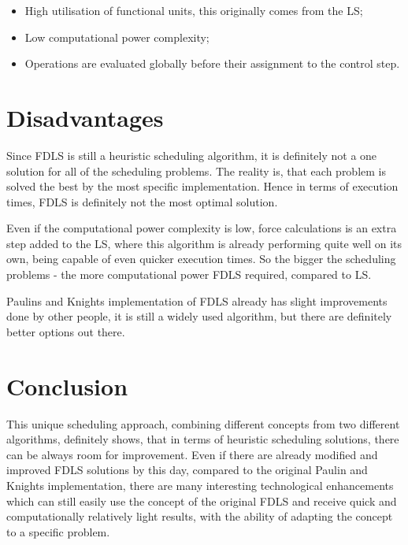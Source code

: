 \documentclass[conference]{IEEEtran}
\begin{document}
\begin{itemize}
\item High utilisation of functional units, this originally comes from the LS;
\item Low computational power complexity;
\item Operations are evaluated globally before their assignment to the control step.
\end{itemize}

\section{Disadvantages}
Since FDLS is still a heuristic scheduling algorithm, it is definitely not a one solution for all of the scheduling problems. The reality is, that each problem is solved the best by the most specific implementation. Hence in terms of execution times, FDLS is definitely not the most optimal solution.

Even if the computational power complexity is low, force calculations is an extra step added to the LS, where this algorithm is already performing quite well on its own, being capable of even quicker execution times. So the bigger the scheduling problems - the more computational power FDLS required, compared to LS.

Paulins and Knights implementation of FDLS already has slight improvements done by other people, it is still a widely used algorithm, but there are definitely better options out there.

\section{Conclusion}
This unique scheduling approach, combining different concepts from two different algorithms, definitely shows, that in terms of heuristic scheduling solutions, there can be always room for improvement. Even if there are already modified and improved FDLS solutions by this day, compared to the original Paulin and Knights implementation, there are many interesting technological enhancements which can still easily use the concept of the original FDLS and receive quick and computationally relatively light results, with the ability of adapting the concept to a specific problem.


\end{document}
